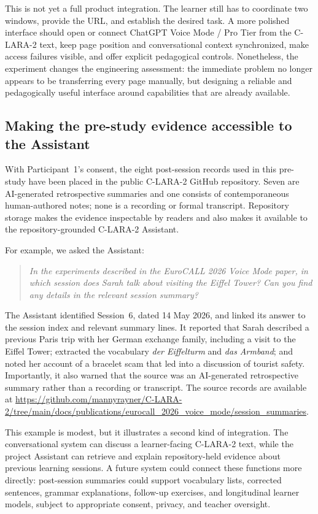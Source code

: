 \documentclass[11pt,a4paper]{article}
\begin{document}
This is not yet a full product integration. The learner still has to coordinate two windows, provide the URL, and establish the desired task. A more polished interface should open or connect ChatGPT Voice Mode / Pro Tier from the C-LARA-2 text, keep page position and conversational context synchronized, make access failures visible, and offer explicit pedagogical controls. Nonetheless, the experiment changes the engineering assessment: the immediate problem no longer appears to be transferring every page manually, but designing a reliable and pedagogically useful interface around capabilities that are already available.

\subsection{Making the pre-study evidence accessible to the Assistant}

With Participant~1's consent, the eight post-session records used in this pre-study have been placed in the public C-LARA-2 GitHub repository. Seven are AI-generated retrospective summaries and one consists of contemporaneous human-authored notes; none is a recording or formal transcript. Repository storage makes the evidence inspectable by readers and also makes it available to the repository-grounded C-LARA-2 Assistant.

For example, we asked the Assistant:

\begin{quote}
\emph{In the experiments described in the EuroCALL 2026 Voice Mode paper, in which session does Sarah talk about visiting the Eiffel Tower? Can you find any details in the relevant session summary?}
\end{quote}

The Assistant identified Session~6, dated 14 May 2026, and linked its answer to the session index and relevant summary lines. It reported that Sarah described a previous Paris trip with her German exchange family, including a visit to the Eiffel Tower; extracted the vocabulary \emph{der Eiffelturm} and \emph{das Armband}; and noted her account of a bracelet scam that led into a discussion of tourist safety. Importantly, it also warned that the source was an AI-generated retrospective summary rather than a recording or transcript. The source records are available at \url{https://github.com/mannyrayner/C-LARA-2/tree/main/docs/publications/eurocall_2026_voice_mode/session_summaries}.

This example is modest, but it illustrates a second kind of integration. The conversational system can discuss a learner-facing C-LARA-2 text, while the project Assistant can retrieve and explain repository-held evidence about previous learning sessions. A future system could connect these functions more directly: post-session summaries could support vocabulary lists, corrected sentences, grammar explanations, follow-up exercises, and longitudinal learner models, subject to appropriate consent, privacy, and teacher oversight.
\end{document}
